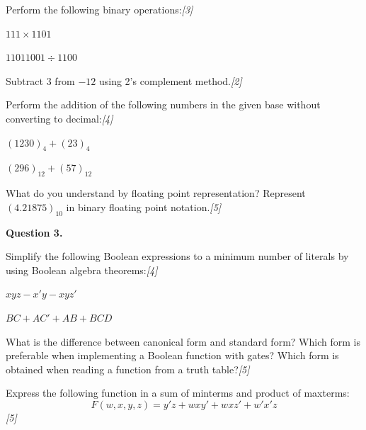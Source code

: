 \documentclass[11pt,a4paper]{article}
\newcommand{\pts}[1]{\hfill   \textit{[#1]}}
\begin{document}
\begin{parts}
  \item Perform the following binary operations:\pts{3}
  
\begin{parts}
    \item $111  \times 1101$
    \item $11011001 \div 1100$
  \end{parts}
  \item Subtract $3$ from $-12$ using 2's complement method.\pts{2}
  \item Perform the addition of the following numbers in the given base without converting to decimal:\pts{4}
  
\begin{parts}
    \item $(1230)_4 + (23)_4$
    \item $(296)_{12} + (57)_{12}$
  \end{parts}
  \item What do you understand by floating point representation? Represent $(4.21875)_{10}$ in binary floating point notation.\pts{5}
\end{parts}

\bigskip




\noindent   \textbf{Question 3.}

\begin{parts}
  \item Simplify the following Boolean expressions to a minimum number of literals by using Boolean algebra theorems:\pts{4}
  
\begin{parts}
    \item $xyz - x'y - xyz'$
    \item $BC + AC' + AB + BCD$
  \end{parts}
  \item What is the difference between canonical form and standard form? Which form is preferable when implementing a Boolean function with gates? Which form is obtained when reading a function from a truth table?\pts{5}
  \item Express the following function in a sum of minterms and product of maxterms:
  \[ F(w, x, y, z) = y'z + wxy' + wxz' + w'x'z \]\pts{5}
\end{parts}

\bigskip
\end{document}
